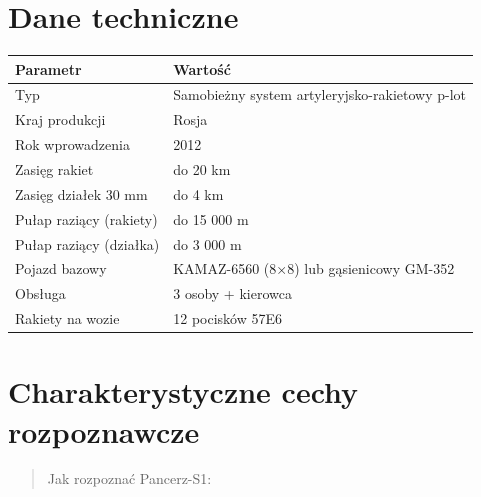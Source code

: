 \documentclass[12pt,openany,oneside]{book}
\begin{document}
\section{Dane techniczne}\label{dane-techniczne-30}

\begin{longtable}[]{@{}ll@{}}
\toprule\noalign{}
Parametr & Wartość \\
\midrule\noalign{}
\endhead
\bottomrule\noalign{}
\endlastfoot
Typ & Samobieżny system artyleryjsko-rakietowy p-lot \\
Kraj produkcji & Rosja \\
Rok wprowadzenia & 2012 \\
Zasięg rakiet & do 20 km \\
Zasięg działek 30 mm & do 4 km \\
Pułap raziący (rakiety) & do 15 000 m \\
Pułap raziący (działka) & do 3 000 m \\
Pojazd bazowy & KAMAZ-6560 (8×8) lub gąsienicowy GM-352 \\
Obsługa & 3 osoby + kierowca \\
Rakiety na wozie & 12 pocisków 57E6 \\
\end{longtable}

\section{Charakterystyczne cechy
rozpoznawcze}\label{charakterystyczne-cechy-rozpoznawcze-30}

\begin{quote}
Jak rozpoznać Pancerz-S1:
\end{quote}
\end{document}
